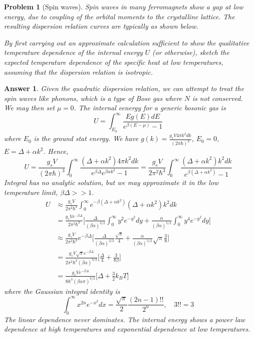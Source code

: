 \documentclass[a4paper]{article}
\newtheorem{ans}{Answer}[section]
\theoremstyle{new}
\newtheorem{qns}{Problem}[section]
\begin{document}
\begin{qns}[Spin waves]
Spin waves in many ferromagnets show a gap at low energy, due to coupling of the orbital moments to the crystalline lattice. The resulting dispersion relation curves are typically as shown below.
\begin{center}
\end{center}
By first carrying out an approximate calculation sufficient to show the qualitative temperature dependence of the internal energy $U$ (or otherwise), sketch the expected temperature dependence of the specific heat at low temperatures, assuming that the dispersion relation is isotropic.
\end{qns}
\begin{ans}
Given the quadratic dispersion relation, we can attempt to treat the spin waves like phonons, which is a type of Bose gas where $N$ is not conserved. We may then set $\mu=0$. The internal eenergy for a generic bosonic gas is
$$U=\int_{E_0}^\infty\frac{Eg(E)dE}{e^{\beta(E-\mu)}-1}$$
where $E_0$ is the ground stat energy. We have $g(k)=\frac{g_sV4\pi k^2dk}{(2\pi\hbar)^3}$, $E_0=0$, $E=\Delta+\alpha k^2$. Hence,
$$U=\frac{g_sV}{(2\pi\hbar)^3}\int_0^\infty\frac{(\Delta+\alpha k^2)4\pi k^2dk}{e^{\beta\Delta}e^{\beta\alpha k^2}-1}=\frac{g_sV}{2\pi^2\hbar^3}\int_0^\infty\frac{(\Delta+\alpha k^2)k^2dk}{e^{\beta(\Delta+\alpha k^2)}-1}$$
Integral has no analytic solution, but we may approximate it in the low temperature limit, $\beta\Delta >>1$. 
\begin{align}
    U&\approx\frac{g_sV}{2\pi^2\hbar^3}\int_0^\infty e^{-\beta(\Delta+\alpha k^2)}(\Delta+\alpha k^2)k^2dk\nonumber\\&=\frac{g_sVe^{-\beta\Delta}}{2\pi^2\hbar^3}\bigg[\frac{\Delta}{(\beta\alpha)^{3/2}}\int_0^\infty y^2e^{-y^2}dy+\frac{\alpha}{(\beta\alpha)^{5/2}}\int_0^\infty y^4e^{-y^2}dy\bigg]\nonumber\\&\approx\frac{g_sV}{2\pi^2\hbar^3}e^{-\beta\Delta}\bigg[\frac{\Delta}{(\beta\alpha)^{3/2}}\frac{\sqrt{\pi}}{4}+\frac{\alpha}{(\beta\alpha)^{5/2}}\sqrt{\pi}\frac{3}{8}\bigg]\nonumber\\&=\frac{g_sV\sqrt{\pi}e^{-\beta\Delta}}{2\pi^2\hbar^3(\beta\alpha)^{3/2}}\bigg[\frac{\Delta}{4}+\frac{3}{8\beta}\bigg]\nonumber\\&=\frac{g_sVe^{-\beta\Delta}}{8\hbar^3(\beta\alpha\pi)^{3/2}}\bigg[\Delta+\frac{3}{2}k_BT\bigg]\nonumber
\end{align}
where the Gaussian integral identity is
$$\int_0^\infty x^{2n}e^{-x^2}dx=\frac{\sqrt{\pi}}{2}\frac{(2n-1)!!}{2^n},\quad 3!!=3$$
The linear dependence never dominates. The internal energy shows a power law dependence at high temperatures and exponential dependence at low temperatures.
\end{ans}
\end{document}
